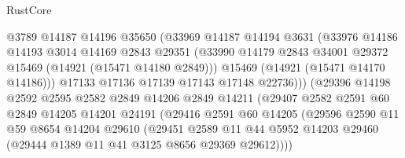 \begin{lexlean}{RustCore}
\begin{coremodule}
                              @3789
                              @14187
                              @14196
                              @35650
                              (@33969
                                @14187
                                @14194
                                @3631
                                (@33976
                                  @14186
                                  @14193
                                  @3014
                                  @14169
                                  @2843
                                  @29351
                                  (@33990
                                    @14179
                                    @2843
                                    @34001
                                    @29372
                                    @15469
                                    (@14921 (@15471 @14180 @2849)))
                                  @15469
                                  (@14921 (@15471 @14170 @14186)))
                                @17133
                                @17136
                                @17139
                                @17143
                                @17148
                                @22736)))
                          (@29396
                            @14198
                            @2592
                            @2595
                            @2582
                            @2849
                            @14206
                            @2849
                            @14211
                            (@29407
                              @2582
                              @2591
                              @60
                              @2849
                              @14205
                              @14201
                              @24191
                              (@29416
                                @2591
                                @60
                                @14205
                                (@29596
                                  @2590
                                  @11
                                  @59
                                  @8654
                                  @14204
                                  @29610
                                  (@29451
                                    @2589
                                    @11
                                    @44
                                    @5952
                                    @14203
                                    @29460
                                    (@29444 @1389 @11 @41 @3125 @8656 @29369 @29612))))

\end{coremodule}
\end{lexlean}
